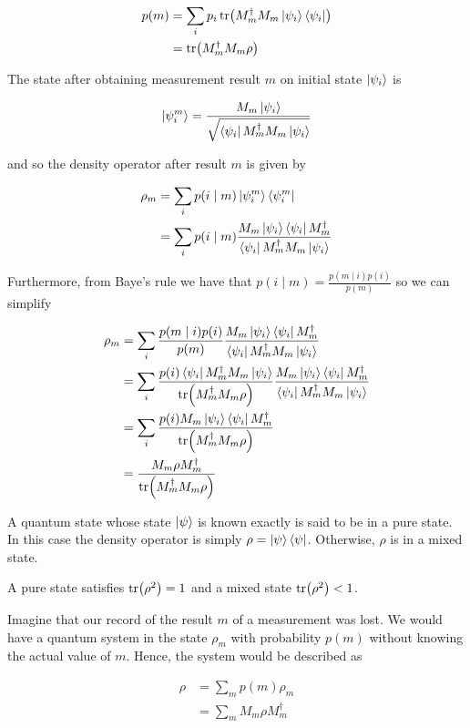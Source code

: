 \documentclass[11pt]{article}
\newcommand\0{\mathbf{0}}
\newcommand\<{\langle}
\renewcommand\>{\rangle}
\begin{document}
\begin{align*}
	p(m) &= \sum_i p_i \tr(M_m^\dag M_m \ket{\psi_i}\bra{\psi_i}) \\
	&= \tr(M_m^\dag M_m \rho)
\end{align*}

The state after obtaining measurement result $m$ on initial state $\ket{\psi_i}$ is

\begin{align*}
\ket{\psi_i^m} = \frac{M_m \ket{\psi_i}}{\sqrt{\bra{\psi_i}M_m^\dag M_m\ket{\psi_i}}}	
\end{align*}

and so the density operator after result $m$ is given by

\begin{align*}
	\rho_m &= \sum_i p(i \mid m ) \ket{\psi_i^m} \bra{\psi_i^m} \\
	&= \sum_i p(i \mid m )\frac{M_m \ket{\psi_i}\bra{\psi_i}M_m^\dag}{\bra{\psi_i}M_m^\dag M_m\ket{\psi_i}}
\end{align*}

Furthermore, from Baye's rule we have that $p(i \mid m) = \frac{p(m \mid i)p(i)}{p(m)}$ so we can simplify

\begin{align*}
	\rho_m &= \sum_i \frac{p(m \mid i)p(i)}{p(m)}\frac{M_m \ket{\psi_i}\bra{\psi_i}M_m^\dag}{\bra{\psi_i}M_m^\dag M_m\ket{\psi_i}} \\
	&= \sum_i \frac{p(i)\bra{\psi_i} M_m^\dag M_m \ket{\psi_i}}{\tr(M_m^\dag M_m \rho)}\frac{M_m \ket{\psi_i}\bra{\psi_i}M_m^\dag}{\bra{\psi_i}M_m^\dag M_m\ket{\psi_i}} \\
	&= \sum_i \frac{p(i)M_m \ket{\psi_i}\bra{\psi_i}M_m^\dag}{\tr(M_m^\dag M_m \rho)} \\
	&= \frac{M_m\rho M_m^\dag}{\tr(M_m^\dag M_m \rho)}
\end{align*}

A quantum state whose state $\ket{\psi}$ is known exactly is said to be in a pure state. In this case the density operator is simply $\rho = \ket{\psi}\bra{\psi}$. Otherwise, $\rho$ is in a mixed state.

A pure state satisfies $\tr(\rho^2) = 1$ and a mixed state $\tr(\rho^2) < 1$.

Imagine that our record of the result $m$ of a measurement was lost. We would have a quantum system in the state $\rho_m$ with probability $p(m)$ without knowing the actual value of $m$. Hence, the system would be described as

\begin{align*}
\rho &= \sum_m p(m) \rho_m	\\
&= \sum_m M_m \rho M_m^\dag 
\end{align*}
\end{document}
